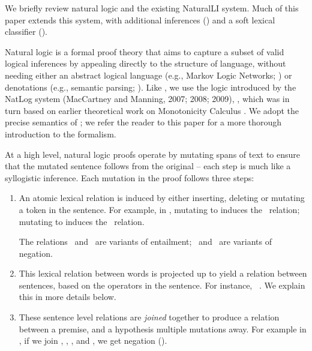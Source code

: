 We briefly review natural logic and the existing NaturalLI system.
Much of this paper extends this system, with additional inferences
  () and a soft lexical classifier ().

Natural logic is a formal proof theory that 
  aims to capture a subset of valid logical
  inferences by appealing directly to the structure of language,
  without needing either an abstract logical language 
  (e.g., Markov Logic Networks; )
  or denotations (e.g., semantic parsing; ).
Like , we use the logic
  introduced by the NatLog system (MacCartney and Manning, 2007; 2008; 2009),
  \nocite{key:2007maccartney-natlog}
  \nocite{key:2008maccartney-natlog}
  \nocite{key:2009maccartney-natlog},
  which was in turn
  based on earlier theoretical work on Monotonicity Calculus
  \cite{key:1986benthem-natlog,key:1991valencia-natlog}.
We adopt the precise semantics of ;
  we refer the reader to this paper for a more thorough introduction to
  the formalism.

At a high level, natural logic proofs operate by mutating spans of text
  to ensure that the mutated sentence follows from the
  original -- each step is much like a syllogistic inference.
Each mutation in the proof follows three steps:

\begin{enumerate}
\setlength\itemsep{-0.25em}
\item An atomic lexical relation is induced by either inserting, deleting
      or mutating a token in the sentence. 
      For example, in ,
      mutating  to  induces the \negate\ relation;
      mutating  to  induces the \forward\ relation.
      
      The relations \equivalent\ and \forward\ are variants of  entailment;
      \negate\ and \alternate\ are variants of negation.

\item This lexical relation between words is projected up to yield a relation between
      sentences, based on the operators in the sentence.
      For instance,  \forward\ .
      We explain this in more details below.

\item These sentence level relations are \textit{joined} together to produce a
      relation between a premise, and a hypothesis multiple mutations away.
      For example in , if we join 
      \forward, \equivalent, \forward, and \negate, we
      get negation (\alternate).
\end{enumerate}

